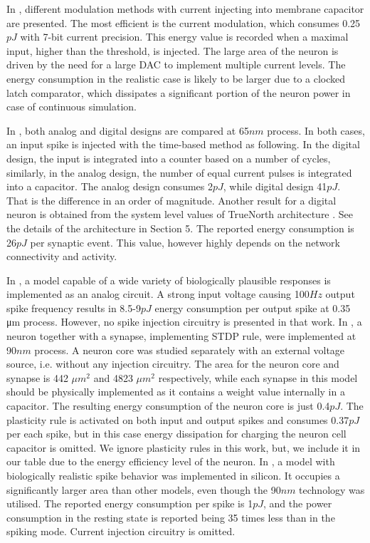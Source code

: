 \documentclass[conference, compsoc]{IEEEtran}
\begin{document}
In \cite{Phong}, different modulation methods with current injecting into membrane capacitor are presented. The most efficient is the current modulation, which consumes 0.25$ pJ $ with 7-bit current precision. This energy value is recorded when a maximal input, higher than the threshold, is injected. The large area of the neuron is driven by the need for a large DAC to implement multiple current levels. The energy consumption in the realistic case is likely to be larger due to a clocked latch comparator, which dissipates a significant portion of the neuron power in case of continuous simulation.

In \cite{HardwareOrAnalog}, both analog and digital designs are compared at 65$ nm $ process. In both cases, an input spike is injected with the time-based method as following. In the digital design, the  input is integrated into a counter based on a number of cycles, similarly, in the analog design, the number of equal current pulses is integrated into a capacitor. The analog design consumes 2$ pJ $, while digital design 41$ pJ $. That is the difference in an order of magnitude. Another result for a digital neuron is obtained from the system level values of TrueNorth architecture \cite{TrueNorth}. See the details of the architecture in Section 5. The reported energy consumption is 26$ pJ $ per synaptic event. This value, however highly depends on the network connectivity and activity.

In \cite{Wijekoon_compact_silicon_circuit}, a model capable of a wide variety of biologically plausible responses is implemented as an analog circuit. A strong input voltage causing 100$ Hz $ output spike frequency results in 8.5-9$ pJ $ energy consumption per output spike at 0.35 μm process. However, no spike injection circuitry is presented in that work. In \cite{Energy-Efficient-Neuron}, a neuron together with a synapse, implementing STDP rule, were implemented at 90$ nm $ process. A neuron core was studied separately with an external voltage source, i.e. without any injection circuitry. The area for the neuron core and synapse is 442 $ \mu m^{2} $ and 4823 $ \mu m^{2} $ respectively, while each synapse in this model should be physically implemented as it contains a weight value internally in a capacitor. The resulting energy consumption of the neuron core  is just 0.4$ pJ $. The plasticity rule is activated on both input and output spikes and consumes 0.37$ pJ $ per each spike, but in this case energy dissipation for charging the neuron cell capacitor is omitted. We ignore plasticity rules in this work, but, we include it in our table due to the energy efficiency level of the neuron. In \cite{Subthreshold_Izhikevich}, a model with biologically realistic spike behavior was implemented in silicon. It occupies a significantly larger area than other models, even though the 90$ nm $ technology was utilised. The reported energy consumption per spike is 1$ pJ $, and the power consumption in the resting state is reported being 35 times less than in the spiking mode. Current injection circuitry is omitted.
\end{document}
